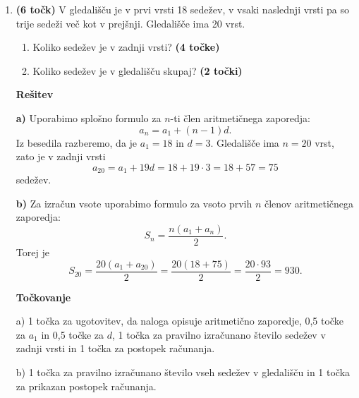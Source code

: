 \documentclass[a4paper,12pt]{article}
\begin{document}
\begin{enumerate}
\vspace{0.5em}

\textbf{\large Rešitev}

\textbf{a)}
Za izračun prvih petih členov uporabimo rekurzivno zvezo $a_{n+1}=a_n+2n+1$:
\[
 a_1=4,
 \quad
 a_2=4+3=7,
 \quad
 a_3=7+5=12,
 \quad
 a_4=12+7=19,
 \quad
 a_5=19+9=28.
\]

\textbf{b)}
Iz dobljenih členov ugotovimo, da je splošni člen
\[
 a_n=n^2+3.
\]

\textbf{c)}
\textit{Baza:} za $n=1$ velja
\[
 a_1=4=1^2+3.
\]
\textit{Indukcijski korak:} predpostavimo, da je $a_n=n^2+3$. Potem je
\[
 a_{n+1}=a_n+2n+1=(n^2+3)+2n+1=n^2+2n+1+3=(n+1)^2+3.
\]
To velja za $a_{n+1}$, zato je domneva pravilna za vse $n\in\mathbb{N}$.

\vspace{0.5em}
\textbf{\large Točkovanje}

 a) 0,5 točke za vsak pravilno izračunan člen $a_1$, $a_2$, $a_3$ in $a_4$.

 \medskip

 b) 1 točka za pravilno zapisano domnevo.

 \medskip

 c) 1 točka za izračun baze indukcije,, 1 točka za pravilni indukcjski korak in 1 točka za sklep.

\vspace{1em}
\clearpage
\item \textbf{(6 točk)} V gledališču je v prvi vrsti 18 sedežev, v vsaki naslednji vrsti pa so trije sedeži več kot v prejšnji. Gledališče ima 20 vrst.
\begin{enumerate}[label=\alph*)]
  \item Koliko sedežev je v zadnji vrsti? \textbf{(4 točke)}
  \item Koliko sedežev je v gledališču skupaj? \textbf{(2 točki)}
\end{enumerate}

\vspace{0.5em}

\textbf{\large Rešitev}

\textbf{a)}
Uporabimo splošno formulo za $n$-ti člen aritmetičnega zaporedja:
\[
 a_n=a_1+(n-1)d.
\]
Iz besedila razberemo, da je $a_1=18$ in $d=3$. Gledališče ima $n=20$ vrst, zato je v zadnji vrsti
\[
 a_{20}=a_1+19d=18+19\cdot 3=18+57=75
\]
sedežev.


\medskip
\textbf{b)}
Za izračun vsote uporabimo formulo za vsoto prvih $n$ členov aritmetičnega zaporedja:
\[
 S_n=\frac{n(a_1+a_n)}{2}.
\]
Torej je
\[
 S_{20}=\frac{20(a_1+a_{20})}{2}=\frac{20(18+75)}{2}=\frac{20\cdot 93}{2}=930.
\]

\vspace{0.5em}
\textbf{\large Točkovanje}

 a) 1 točka za ugotovitev, da naloga opisuje aritmetično zaporedje, 0,5 točke za $a_1$ in 0,5 točke za $d$, 1 točka za pravilno izračunano število sedežev v zadnji vrsti in 1 točka za postopek računanja. 
 
 \medskip

 b) 1 točka za pravilno izračunano število vseh sedežev v gledališču in 1 točka za prikazan postopek računanja.
 
 
\end{enumerate}
\end{document}
